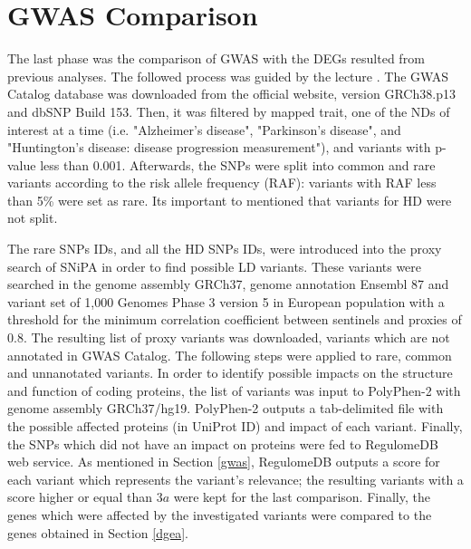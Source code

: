 \section{GWAS Comparison} \label{gwas-method}

The last phase was the comparison of GWAS with the DEGs resulted from previous analyses. The followed process was guided by the lecture \cite{Prokob}. The GWAS Catalog database was downloaded from the official website, version GRCh38.p13 and dbSNP Build 153. Then, it was filtered by mapped trait, one of the NDs of interest at a time (i.e. "Alzheimer's disease", "Parkinson's disease", and "Huntington's disease: disease progression measurement"), and variants with p-value less than 0.001. Afterwards, the SNPs were split into common and rare variants according to the risk allele frequency (RAF): variants with RAF less than 5\% were set as rare. Its important to mentioned that variants for HD were not split.

The rare SNPs IDs, and all the HD SNPs IDs, were introduced into the proxy search of SNiPA in order to find possible LD variants. These variants were searched in the genome assembly GRCh37, genome annotation Ensembl 87 and variant set of 1,000 Genomes Phase 3 version 5 in European population with a threshold for the minimum correlation coefficient between sentinels and proxies of 0.8. The resulting list of proxy variants was downloaded, variants which are not annotated in GWAS Catalog. The following steps were applied to rare, common and unnanotated variants. In order to identify possible impacts on the structure and function of coding proteins, the list of variants was input to PolyPhen-2 with genome assembly GRCh37/hg19. PolyPhen-2 outputs a tab-delimited file with the possible affected proteins (in UniProt ID) and impact of each variant. Finally, the SNPs which did not have an impact on proteins were fed to RegulomeDB web service. As mentioned in Section \ref{gwas}, RegulomeDB outputs a score for each variant which represents the variant's relevance; the resulting variants with a score higher or equal than $3a$ were kept for the last comparison. Finally, the genes which were affected by the investigated variants were compared to the genes obtained in Section \ref{dgea}.